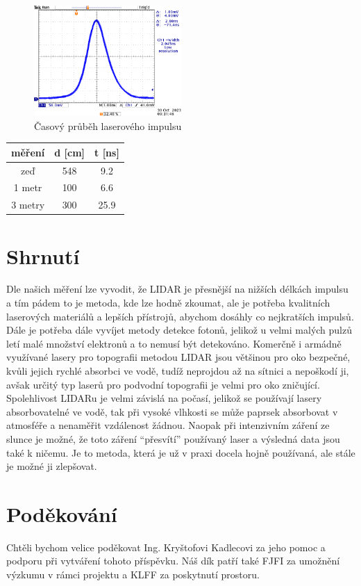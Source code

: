 \documentclass[12pt,a4paper]{article}
\begin{document}
\begin{figure}[h!]
    \centering
    \includegraphics[width=0.5\textwidth]{prubeh_impulsu.png}
    \caption{Časový průběh laserového impulsu}
\end{figure}

\begin{center}
    \begin{tabular}{||c c c||} 
     \hline
      měření & d [cm] & t [ns] \\ [0.5ex] 
     \hline\hline
     zeď & 548 & 9.2 \\ 
     \hline
     1 metr & 100 & 6.6 \\
     \hline
     3 metry & 300 & 25.9 \\
     \hline
    \end{tabular}
    \end{center}
\pagebreak
\section{Shrnutí}
Dle našich měření lze vyvodit, že LIDAR je přesnější na nižších délkách impulsu a tím pádem to je metoda, kde lze hodně zkoumat, ale je potřeba kvalitních laserových materiálů a lepších přístrojů, abychom dosáhly co nejkratších impulsů. Dále je potřeba dále vyvíjet metody detekce fotonů, jelikož u velmi malých pulzů letí malé množství elektronů a to nemusí být detekováno. Komerčně i armádně využívané lasery pro topografii metodou LIDAR jsou většinou pro oko bezpečné, kvůli jejich rychlé absorbci ve vodě, tudíž neprojdou až na sítnici a nepoškodí ji, avšak určitý typ laserů pro podvodní topografii je velmi pro oko zničující. Spolehlivost LIDARu je velmi závislá na počasí, jelikož se používají lasery absorbovatelné ve vodě, tak při vysoké vlhkosti se může paprsek absorbovat v atmosféře a nenaměřit vzdálenost žádnou. Naopak při intenzivním záření ze slunce je možné, že toto záření “přesvítí” používaný laser a výsledná data jsou také k ničemu.
Je to metoda, která je už v praxi docela hojně používaná, ale stále je možné ji zlepšovat.


\section*{Poděkování}
Chtěli bychom velice poděkovat Ing. Kryštofovi Kadlecovi za jeho pomoc a podporu při vytváření tohoto příspěvku.
Náš dík patří také FJFI za umožnění výzkumu v rámci projektu a KLFF za poskytnutí prostoru.
\printbibliography
\end{document}
